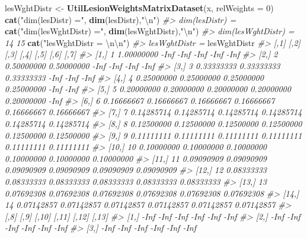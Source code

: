 \documentclass[
]{book}
\newenvironment{Shaded}{\begin{snugshade}}{\end{snugshade}}
\newcommand{\CharTok}[1]{\textcolor[rgb]{0.31,0.60,0.02}{#1}}
\newcommand{\CommentTok}[1]{\textcolor[rgb]{0.56,0.35,0.01}{\textit{#1}}}
\newcommand{\DataTypeTok}[1]{\textcolor[rgb]{0.13,0.29,0.53}{#1}}
\newcommand{\DecValTok}[1]{\textcolor[rgb]{0.00,0.00,0.81}{#1}}
\newcommand{\KeywordTok}[1]{\textcolor[rgb]{0.13,0.29,0.53}{\textbf{#1}}}
\newcommand{\NormalTok}[1]{#1}
\newcommand{\StringTok}[1]{\textcolor[rgb]{0.31,0.60,0.02}{#1}}
\begin{document}
\begin{Shaded}
\begin{Highlighting}[]
\NormalTok{lesWghtDistr <-}\StringTok{ }\KeywordTok{UtilLesionWeightsMatrixDataset}\NormalTok{(x, }\DataTypeTok{relWeights =} \DecValTok{0}\NormalTok{)}
\KeywordTok{cat}\NormalTok{(}\StringTok{"dim(lesDistr) ="}\NormalTok{, }\KeywordTok{dim}\NormalTok{(lesDistr),}\StringTok{"}\CharTok{\textbackslash{}n}\StringTok{"}\NormalTok{)}
\CommentTok{#> dim(lesDistr) =}
\KeywordTok{cat}\NormalTok{(}\StringTok{"dim(lesWghtDistr) ="}\NormalTok{, }\KeywordTok{dim}\NormalTok{(lesWghtDistr),}\StringTok{"}\CharTok{\textbackslash{}n}\StringTok{"}\NormalTok{)}
\CommentTok{#> dim(lesWghtDistr) = 14 15}
\KeywordTok{cat}\NormalTok{(}\StringTok{"lesWghtDistr = }\CharTok{\textbackslash{}n\textbackslash{}n}\StringTok{"}\NormalTok{)}
\CommentTok{#> lesWghtDistr =}
\NormalTok{lesWghtDistr}
\CommentTok{#>       [,1]       [,2]       [,3]       [,4]       [,5]       [,6]       [,7]}
\CommentTok{#>  [1,]    1 1.00000000       -Inf       -Inf       -Inf       -Inf       -Inf}
\CommentTok{#>  [2,]    2 0.50000000 0.50000000       -Inf       -Inf       -Inf       -Inf}
\CommentTok{#>  [3,]    3 0.33333333 0.33333333 0.33333333       -Inf       -Inf       -Inf}
\CommentTok{#>  [4,]    4 0.25000000 0.25000000 0.25000000 0.25000000       -Inf       -Inf}
\CommentTok{#>  [5,]    5 0.20000000 0.20000000 0.20000000 0.20000000 0.20000000       -Inf}
\CommentTok{#>  [6,]    6 0.16666667 0.16666667 0.16666667 0.16666667 0.16666667 0.16666667}
\CommentTok{#>  [7,]    7 0.14285714 0.14285714 0.14285714 0.14285714 0.14285714 0.14285714}
\CommentTok{#>  [8,]    8 0.12500000 0.12500000 0.12500000 0.12500000 0.12500000 0.12500000}
\CommentTok{#>  [9,]    9 0.11111111 0.11111111 0.11111111 0.11111111 0.11111111 0.11111111}
\CommentTok{#> [10,]   10 0.10000000 0.10000000 0.10000000 0.10000000 0.10000000 0.10000000}
\CommentTok{#> [11,]   11 0.09090909 0.09090909 0.09090909 0.09090909 0.09090909 0.09090909}
\CommentTok{#> [12,]   12 0.08333333 0.08333333 0.08333333 0.08333333 0.08333333 0.08333333}
\CommentTok{#> [13,]   13 0.07692308 0.07692308 0.07692308 0.07692308 0.07692308 0.07692308}
\CommentTok{#> [14,]   14 0.07142857 0.07142857 0.07142857 0.07142857 0.07142857 0.07142857}
\CommentTok{#>             [,8]       [,9]      [,10]      [,11]      [,12]      [,13]}
\CommentTok{#>  [1,]       -Inf       -Inf       -Inf       -Inf       -Inf       -Inf}
\CommentTok{#>  [2,]       -Inf       -Inf       -Inf       -Inf       -Inf       -Inf}
\CommentTok{#>  [3,]       -Inf       -Inf       -Inf       -Inf       -Inf       -Inf}

\end{Highlighting}
\end{Shaded}
\end{document}
